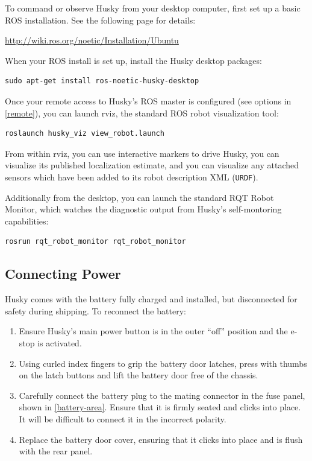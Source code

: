 \documentclass[]{clearpath-latex/clearpath-manual}
\begin{document}
To command or observe Husky from your desktop computer, first set up a basic
ROS installation. See the following page for details:

\url{http://wiki.ros.org/noetic/Installation/Ubuntu}

When your ROS install is set up, install the Husky desktop packages:

\begin{lstlisting}
sudo apt-get install ros-noetic-husky-desktop
\end{lstlisting}

Once your remote access to Husky's ROS master is configured (see options in \autoref{remote}),
you can launch rviz, the standard ROS robot visualization tool:

\begin{lstlisting}
roslaunch husky_viz view_robot.launch
\end{lstlisting}

From within rviz, you can use interactive markers to drive Husky, you can visualize its
published localization estimate, and you can visualize any attached sensors which have been
added to its robot description XML (\lstinline{URDF}).

Additionally from the desktop, you can launch the standard RQT Robot Monitor, which
watches the diagnostic output from Husky's self-montoring capabilities:

\begin{lstlisting}
rosrun rqt_robot_monitor rqt_robot_monitor
\end{lstlisting}

\newpage

\subsection{Connecting Power}
Husky comes with the battery fully charged and installed, but disconnected for safety during shipping.
To reconnect the battery:

\begin{enumerate}
	\item Ensure Husky’s main power button is in the outer “off” position and the e-stop is activated.
	\item Using curled index fingers to grip the battery door latches, press with thumbs on the latch buttons and lift the battery door free of the chassis.
	\item Carefully connect the battery plug to the mating connector in the fuse panel, shown in \autoref{battery-area}. Ensure that it is firmly seated and clicks into place. It will be difficult to connect it in the incorrect polarity.
	\item Replace the battery door cover, ensuring that it clicks into place and is flush with the rear panel.
\end{enumerate}
\end{document}
